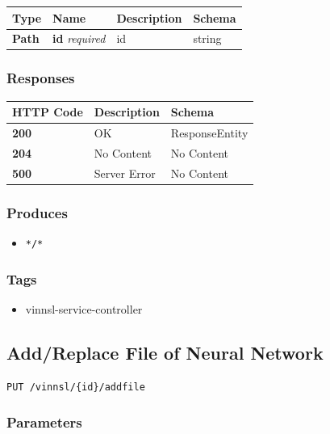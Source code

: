 \begin{longtable}[]{@{}llll@{}}
\toprule
Type & Name & Description & Schema\tabularnewline
\midrule
\endhead
\textbf{Path} & \textbf{id} \emph{required} & id & string\tabularnewline
\bottomrule
\end{longtable}

\subsubsection{Responses}\label{responses-4}

\begin{longtable}[]{@{}lll@{}}
\toprule
HTTP Code & Description & Schema\tabularnewline
\midrule
\endhead
\textbf{200} & OK & ResponseEntity\tabularnewline
\textbf{204} & No Content & No Content\tabularnewline
\textbf{500} & Server Error & No Content\tabularnewline
\bottomrule
\end{longtable}

\subsubsection{Produces}\label{produces-4}

\begin{itemize}
\tightlist
\item
  \texttt{*/*}
\end{itemize}

\subsubsection{Tags}\label{tags-4}

\begin{itemize}
\tightlist
\item
  vinnsl-service-controller
\end{itemize}

\subsection{Add/Replace File of Neural
Network}\label{addreplace-file-of-neural-network}

\begin{verbatim}
PUT /vinnsl/{id}/addfile
\end{verbatim}

\subsubsection{Parameters}\label{parameters-3}

